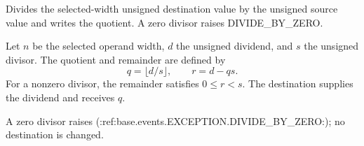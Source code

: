 Divides the selected-width unsigned destination value by the unsigned source value and writes the quotient. A zero divisor raises DIVIDE\_BY\_ZERO.


Let \(n\) be the selected operand width, \(d\) the unsigned dividend, and \(s\) the unsigned divisor. The quotient and remainder are defined by
\[
  q = \lfloor d/s \rfloor,
  \qquad r = d - qs .
\]
For a nonzero divisor, the remainder satisfies \(0 \le r < s\). The destination supplies the dividend and receives \(q\).

A zero divisor raises (:ref:base.events.EXCEPTION.DIVIDE_BY_ZERO:); no destination is changed.
